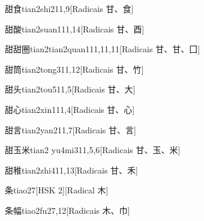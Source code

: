 \begin{entry}{甜食}{tian2shi2}{11,9}[Radicais ⽢、⾷]
\end{entry}

\begin{entry}{甜酸}{tian2suan1}{11,14}[Radicais ⽢、⾣]
\end{entry}

\begin{entry}{甜甜圈}{tian2tian2quan1}{11,11,11}[Radicais ⽢、⽢、⼞]
\end{entry}

\begin{entry}{甜筒}{tian2tong3}{11,12}[Radicais ⽢、⽵]
\end{entry}

\begin{entry}{甜头}{tian2tou5}{11,5}[Radicais ⽢、⼤]
\end{entry}

\begin{entry}{甜心}{tian2xin1}{11,4}[Radicais ⽢、⼼]
\end{entry}

\begin{entry}{甜言}{tian2yan2}{11,7}[Radicais ⽢、⾔]
\end{entry}

\begin{entry}{甜玉米}{tian2 yu4mi3}{11,5,6}[Radicais ⽢、⽟、⽶]
\end{entry}

\begin{entry}{甜稚}{tian2zhi4}{11,13}[Radicais ⽢、⽲]
\end{entry}

\begin{entry}{条}{tiao2}{7}[HSK 2][Radical ⽊]
\end{entry}

\begin{entry}{条幅}{tiao2fu2}{7,12}[Radicais ⽊、⼱]
\end{entry}


